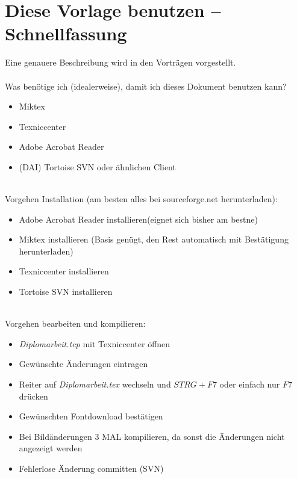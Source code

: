 \section{Diese Vorlage benutzen -- Schnellfassung}
Eine genauere Beschreibung wird in den Vorträgen vorgestellt.\\

\noindent\\ Was benötige ich (idealerweise), damit ich dieses Dokument benutzen kann?
\begin{itemize}
\item Miktex
\item Texniccenter
\item Adobe Acrobat Reader
\item (DAI) Tortoise SVN oder ähnlichen Client
\end{itemize}

\noindent\\ Vorgehen Installation (am besten alles bei sourceforge.net herunterladen):
\begin{itemize}
\item Adobe Acrobat Reader installieren(eignet sich bisher am bestne)
\item Miktex installieren (Basis genügt, den Rest automatisch mit Bestätigung herunterladen)
\item Texniccenter installieren
\item Tortoise SVN installieren
\end{itemize}

\noindent\\ Vorgehen bearbeiten und kompilieren:
\begin{itemize}
\item {\em Diplomarbeit.tcp} mit Texniccenter öffnen
\item Gewünschte Änderungen eintragen
\item Reiter auf {\em Diplomarbeit.tex} wechseln und $STRG+F7$ oder einfach nur $F7$ drücken
\item Gewünschten Fontdownload bestätigen
\item Bei Bildänderungen $3$ MAL kompilieren, da sonst die Änderungen nicht angezeigt werden
\item Fehlerlose Änderung committen (SVN)
\end{itemize}

